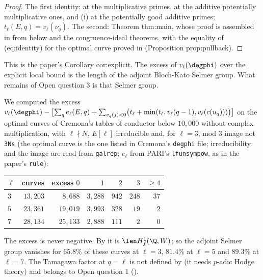 \begin{proof}
The first identity:  at the multiplicative primes,  at the additive potentially multiplicative ones, and
(i) at the potentially good additive primes; $t_\ell(E,q)=v_\ell(\nu_q)$. The second: Theorem thm:main, whose proof is assembled in
 from  below and the congruence-ideal theorems, with the equality of (eq:identity) for the optimal curve proved in
 (Proposition prop:pullback).
\end{proof}

This is the paper's Corollary cor:explicit. The excess of $v_\ell(\degphi)$ over the explicit local bound is the length of the adjoint Bloch-Kato Selmer group. What
remains of Open question 3 is that Selmer group.

\begin{remark}\label{rem:blochkato:open-question-3}
We computed the excess $v_\ell(\degphi)-\bigl[\sum_qe_\ell(E,q)+\sum_{v_q(j)<0}\bigl(t_\ell+\min(t_\ell,v_\ell(q-1),v_\ell(c(u_q)))\bigr)\bigr]$ on the optimal curves of Cremona's tables of
conductor below $10{,}000$ without complex multiplication, with $\ell\nmid N$, $E[\ell]$ irreducible and, for $\ell=3$, mod $3$ image not \texttt{3Ns} (the optimal curve is the one
listed in Cremona's \texttt{degphi} file; irreducibility and the image are read from \texttt{galrep}; $e_\ell$ from PARI's \texttt{lfunsympow}, as in the paper's \texttt{rule}):
\begin{center}\small
\begin{tabular}{lrrrrrr}
\toprule
$\ell$ & curves & excess $0$ & $1$ & $2$ & $3$ & $\ge4$\\
\midrule
$3$ & $13{,}203$ & $8{,}688$ & $3{,}288$ & $942$ & $248$ & $37$\\
$5$ & $23{,}361$ & $19{,}019$ & $3{,}993$ & $328$ & $19$ & $2$\\
$7$ & $28{,}134$ & $25{,}133$ & $2{,}888$ & $111$ & $2$ & $0$\\
\bottomrule
\end{tabular}
\end{center}
The excess is never negative. By  it is $\len H^1_f(\Q,W)$; so the adjoint Selmer group vanishes for $65.8\%$ of these curves at $\ell=3$,
$81.4\%$ at $\ell=5$ and $89.3\%$ at $\ell=7$. The Tamagawa factor at $q=\ell$ is not defined by  (it needs $p$-adic Hodge theory) and belongs to Open
question 1 ().
\end{remark}

